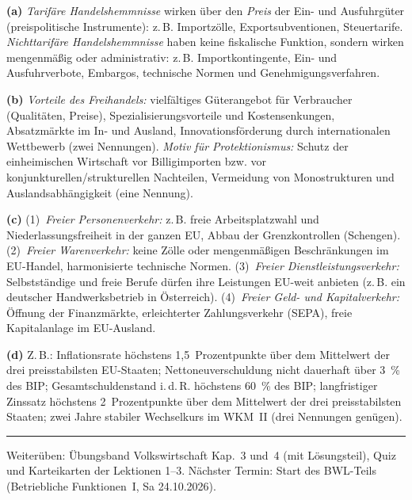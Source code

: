 \documentclass[11pt, a4paper]{article}
\begin{document}
\begin{loesung}[title={Lösung Aufgabe~9 --- Außenwirtschaft und EU}]
\textbf{(a)} \emph{Tarifäre Handelshemmnisse} wirken über den \emph{Preis} der Ein- und
Ausfuhrgüter (preispolitische Instrumente): z.\,B. Importzölle, Exportsubventionen,
Steuertarife. \emph{Nichttarifäre Handelshemmnisse} haben keine fiskalische Funktion,
sondern wirken mengenmäßig oder administrativ: z.\,B. Importkontingente, Ein- und
Ausfuhrverbote, Embargos, technische Normen und Genehmigungsverfahren.

\textbf{(b)} \emph{Vorteile des Freihandels:} vielfältiges Güterangebot für Verbraucher
(Qualitäten, Preise), Spezialisierungsvorteile und Kostensenkungen, Absatzmärkte im In-
und Ausland, Innovationsförderung durch internationalen Wettbewerb (zwei Nennungen).
\emph{Motiv für Protektionismus:} Schutz der einheimischen Wirtschaft vor Billigimporten
bzw. vor konjunkturellen/strukturellen Nachteilen, Vermeidung von Monostrukturen und
Auslandsabhängigkeit (eine Nennung).

\textbf{(c)} (1)~\emph{Freier Personenverkehr:} z.\,B. freie Arbeitsplatzwahl und
Niederlassungsfreiheit in der ganzen EU, Abbau der Grenzkontrollen (Schengen).
(2)~\emph{Freier Warenverkehr:} keine Zölle oder mengenmäßigen Beschränkungen im
EU-Handel, harmonisierte technische Normen. (3)~\emph{Freier Dienstleistungsverkehr:}
Selbstständige und freie Berufe dürfen ihre Leistungen EU-weit anbieten (z.\,B. ein
deutscher Handwerksbetrieb in Österreich). (4)~\emph{Freier Geld- und Kapitalverkehr:}
Öffnung der Finanzmärkte, erleichterter Zahlungsverkehr (SEPA), freie Kapitalanlage im
EU-Ausland.

\textbf{(d)} Z.\,B.: Inflationsrate höchstens 1,5~Prozentpunkte über dem Mittelwert der
drei preisstabilsten EU-Staaten; Nettoneuverschuldung nicht dauerhaft über 3~\% des BIP;
Gesamtschuldenstand i.\,d.\,R. höchstens 60~\% des BIP; langfristiger Zinssatz höchstens
2~Prozentpunkte über dem Mittelwert der drei preisstabilsten Staaten; zwei Jahre stabiler
Wechselkurs im WKM~II (drei Nennungen genügen).
\end{loesung}

\vspace{1em}
\hrule
\vspace{0.8em}
\noindent\textsf{\small Weiterüben: Übungsband Volkswirtschaft Kap.~3 und~4 (mit Lösungsteil), Quiz und
Karteikarten der Lektionen 1--3. Nächster Termin: Start des BWL-Teils (Betriebliche Funktionen~I, Sa 24.10.2026).}
\end{document}

